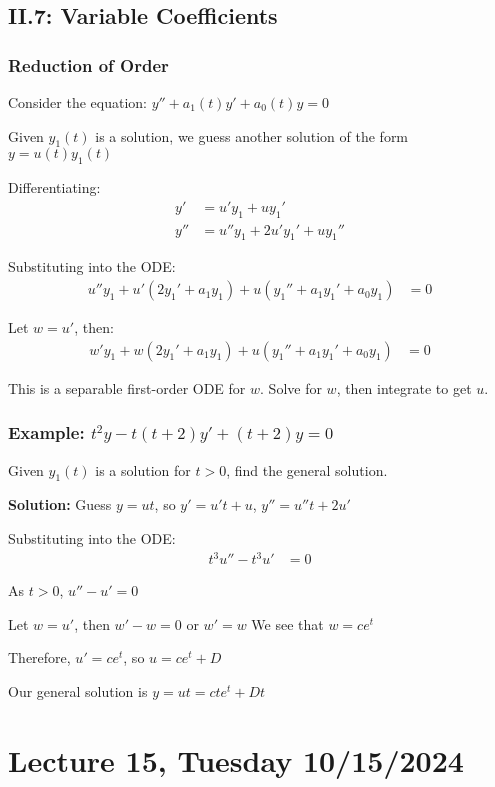 \documentclass{article}
\begin{document}
\subsection*{II.7: Variable Coefficients}

\subsubsection*{Reduction of Order}

Consider the equation: $y''+a_1(t)y'+a_0(t)y = 0$

Given $y_1(t)$ is a solution, we guess another solution of the form $y = u(t)y_1(t)$

Differentiating:
\begin{align*}
y' &= u'y_1+uy_1' \\
y'' &= u''y_1+2u'y_1'+uy_1''
\end{align*}

Substituting into the ODE:
\begin{align*}
u''y_1+u'(2y_1'+a_1y_1)+u(y_1''+a_1y_1'+a_0y_1) &= 0
\end{align*}

Let $w = u'$, then:
\begin{align*}
w'y_1+w(2y_1'+a_1y_1)+u(y_1''+a_1y_1'+a_0y_1) &= 0
\end{align*}

This is a separable first-order ODE for $w$. Solve for $w$, then integrate to get $u$.

\subsubsection*{Example: $t^2y-t(t+2)y'+(t+2)y = 0$}

Given $y_1(t)$ is a solution for $t > 0$, find the general solution.

\textbf{Solution:} 
Guess $y = ut$, so $y' = u't+u$, $y'' = u''t+2u'$

Substituting into the ODE:
\begin{align*}
t^3u''-t^3u' &= 0
\end{align*}

As $t > 0$, $u''-u' = 0$

Let $w = u'$, then $w'-w = 0$ or $w' = w$
We see that $w = ce^t$

Therefore, $u' = ce^t$, so $u = ce^t+D$

Our general solution is $y = ut = cte^t+Dt$

\section*{Lecture 15, Tuesday 10/15/2024}
\end{document}
